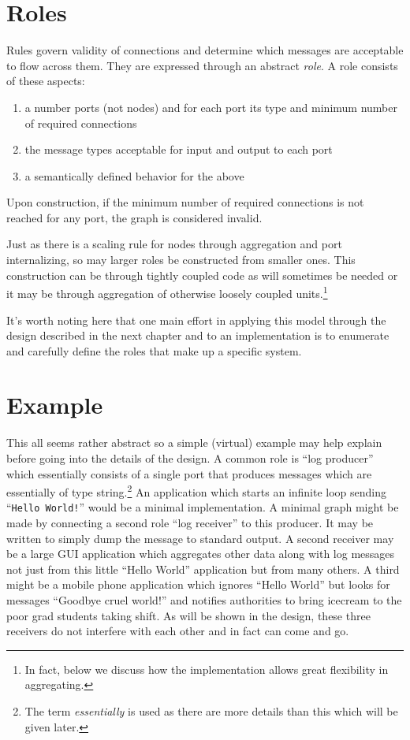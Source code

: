 \documentclass[letterpaper,oneside]{memoir}
\begin{document}
\section{Roles}
\label{sec:roles}

Rules govern validity of connections and determine which messages are acceptable to flow across them.
They are expressed through an abstract \textit{role}. 
A role consists of these aspects:

\begin{enumerate}
\item a number ports (not nodes) and for each port its type and minimum number of required connections
\item the message types acceptable for input and output to each port 
\item a semantically defined behavior for the above
\end{enumerate}

\noindent Upon construction, if the minimum number of required connections is not reached for any port, the graph is considered invalid.

Just as there is a scaling rule for nodes through aggregation and port internalizing, so may larger roles be constructed from smaller ones. 
This construction can be through tightly coupled code as will sometimes be needed or it may be through aggregation of otherwise loosely coupled units.\footnote{In fact, below we discuss how the implementation allows great flexibility in aggregating.}

It's worth noting here that one main effort in applying this model through the design described in the next chapter and to an implementation is to enumerate and carefully define the roles that make up a specific system.

\section{Example}

This all seems rather abstract so a simple (virtual) example may help explain before going into the details of the design. 
A common role is ``log producer'' which essentially consists of a single port that produces messages which are essentially of type string.\footnote{The term \textit{essentially} is used as there are more details than this which will be given later.} 
An application which starts an infinite loop sending ``\texttt{Hello World!}'' would be a minimal implementation. 
A minimal graph might be made by connecting a second role ``log receiver'' to this producer. 
It may be written to simply dump the message to standard output. 
A second receiver may be a large GUI application which aggregates other data along with log messages not just from this little ``Hello World'' application but from many others. 
A third might be a mobile phone application which ignores ``Hello World'' but looks for messages ``Goodbye cruel world!'' and notifies authorities to bring icecream to the poor grad students taking shift. 
As will be shown in the design, these three receivers do not interfere with each other and in fact can come and go.
\end{document}
